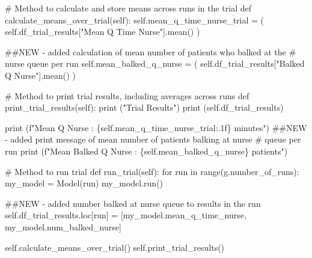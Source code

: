 \documentclass[
  letterpaper,
  DIV=11,
  numbers=noendperiod]{scrreprt}
\newenvironment{Shaded}{\begin{snugshade}}{\end{snugshade}}
\newcommand{\BuiltInTok}[1]{\textcolor[rgb]{0.00,0.23,0.31}{#1}}
\newcommand{\CommentTok}[1]{\textcolor[rgb]{0.37,0.37,0.37}{#1}}
\newcommand{\ControlFlowTok}[1]{\textcolor[rgb]{0.00,0.23,0.31}{#1}}
\newcommand{\KeywordTok}[1]{\textcolor[rgb]{0.00,0.23,0.31}{#1}}
\newcommand{\NormalTok}[1]{\textcolor[rgb]{0.00,0.23,0.31}{#1}}
\newcommand{\OperatorTok}[1]{\textcolor[rgb]{0.37,0.37,0.37}{#1}}
\newcommand{\SpecialCharTok}[1]{\textcolor[rgb]{0.37,0.37,0.37}{#1}}
\newcommand{\SpecialStringTok}[1]{\textcolor[rgb]{0.13,0.47,0.30}{#1}}
\newcommand{\StringTok}[1]{\textcolor[rgb]{0.13,0.47,0.30}{#1}}
\newcommand{\VariableTok}[1]{\textcolor[rgb]{0.07,0.07,0.07}{#1}}
\begin{document}
\begin{tcolorbox}
\begin{Shaded}
\begin{Highlighting}[]
    \CommentTok{\# Method to calculate and store means across runs in the trial}
    \KeywordTok{def}\NormalTok{ calculate\_means\_over\_trial(}\VariableTok{self}\NormalTok{):}
        \VariableTok{self}\NormalTok{.mean\_q\_time\_nurse\_trial }\OperatorTok{=}\NormalTok{ (}
            \VariableTok{self}\NormalTok{.df\_trial\_results[}\StringTok{"Mean Q Time Nurse"}\NormalTok{].mean()}
\NormalTok{        )}

        \CommentTok{\#\#NEW {-} added calculation of mean number of patients who balked at the}
        \CommentTok{\# nurse queue per run}
        \VariableTok{self}\NormalTok{.mean\_balked\_q\_nurse }\OperatorTok{=}\NormalTok{ (}
            \VariableTok{self}\NormalTok{.df\_trial\_results[}\StringTok{"Balked Q Nurse"}\NormalTok{].mean()}
\NormalTok{        )}

    \CommentTok{\# Method to print trial results, including averages across runs}
    \KeywordTok{def}\NormalTok{ print\_trial\_results(}\VariableTok{self}\NormalTok{):}
        \BuiltInTok{print}\NormalTok{ (}\StringTok{"Trial Results"}\NormalTok{)}
        \BuiltInTok{print}\NormalTok{ (}\VariableTok{self}\NormalTok{.df\_trial\_results)}

        \BuiltInTok{print}\NormalTok{ (}\SpecialStringTok{f"Mean Q Nurse : }\SpecialCharTok{\{}\VariableTok{self}\SpecialCharTok{.}\NormalTok{mean\_q\_time\_nurse\_trial}\SpecialCharTok{:.1f\}}\SpecialStringTok{ minutes"}\NormalTok{)}
        \CommentTok{\#\#NEW {-} added print message of mean number of patients balking at nurse}
        \CommentTok{\# queue per run}
        \BuiltInTok{print}\NormalTok{ (}\SpecialStringTok{f"Mean Balked Q Nurse : }\SpecialCharTok{\{}\VariableTok{self}\SpecialCharTok{.}\NormalTok{mean\_balked\_q\_nurse}\SpecialCharTok{\}}\SpecialStringTok{ patients"}\NormalTok{)}

    \CommentTok{\# Method to run trial}
    \KeywordTok{def}\NormalTok{ run\_trial(}\VariableTok{self}\NormalTok{):}
        \ControlFlowTok{for}\NormalTok{ run }\KeywordTok{in} \BuiltInTok{range}\NormalTok{(g.number\_of\_runs):}
\NormalTok{            my\_model }\OperatorTok{=}\NormalTok{ Model(run)}
\NormalTok{            my\_model.run()}

            \CommentTok{\#\#NEW {-} added number balked at nurse queue to results in the run}
            \VariableTok{self}\NormalTok{.df\_trial\_results.loc[run] }\OperatorTok{=}\NormalTok{ [my\_model.mean\_q\_time\_nurse,}
\NormalTok{                                              my\_model.num\_balked\_nurse]}

        \VariableTok{self}\NormalTok{.calculate\_means\_over\_trial()}
        \VariableTok{self}\NormalTok{.print\_trial\_results()}
\end{Highlighting}
\end{Shaded}

\end{tcolorbox}
\end{document}

